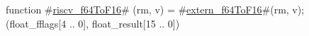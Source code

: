 function #\hyperref[sailRISCVzriscvzyf64ToF16]{riscv\_f64ToF16}# (rm, v) = {
  #\hyperref[sailRISCVzexternzyf64ToF16]{extern\_f64ToF16}#(rm, v);
  (float_fflags[4 .. 0], float_result[15 .. 0])
}
